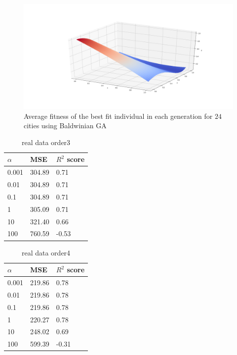 \documentclass [11pt]{article}
\begin{document}
\begin{figure}[H]
\centering
\includegraphics[width=1\textwidth]{figures/LassoFranke.png}
        \caption{Average fitness of the best fit individual in each generation for $24$ cities using Baldwinian GA}
        \label{fig:LassoFranke}
\end{figure}
\begin{table}[H]
\centering
\begin{tabular}{lll}
\hline
$\alpha$ & MSE    & $R^{2}$ score \\ \hline
0.001     & 304.89 & 0.71          \\
0.01      & 304.89 & 0.71          \\
0.1       & 304.89 & 0.71         \\
1         & 305.09 & 0.71         \\
10        & 321.40 & 0.66          \\
100       & 760.59 & -0.53          \\ \hline
\end{tabular}
\caption{real data order3}
\label{tab:ridge3Terrain}
\end{table}

\begin{table}[H]
\centering
\begin{tabular}{lll}
\hline
$\alpha$ & MSE    & $R^{2}$ score \\ \hline
0.001     & 219.86 & 0.78          \\
0.01      & 219.86 & 0.78          \\
0.1       & 219.86 & 0.78         \\
1         & 220.27 & 0.78          \\
10        & 248.02 & 0.69          \\
100       & 599.39 & -0.31          \\ \hline
\end{tabular}
\caption{real data order4}
\label{tab:ridge4Terrain}
\end{table}
\end{document}
